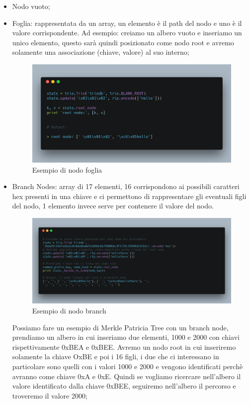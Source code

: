 \documentclass[12pt]{report}
\begin{document}
\begin{itemize}
\item Nodo vuoto;
\item Foglia: rappresentata da un array, un elemento è il path del nodo e uno è il valore corrispondente. Ad esempio: creiamo un albero vuoto e inseriamo un unico elemento, questo sarà quindi posizionato come nodo root e avremo solamente una associazione (chiave, valore) al suo interno;

\begin{figure}[H]
    \includegraphics[width=\textwidth]{carbon-11}
    \caption{Esempio di nodo foglia}
\end{figure}
\item Branch Nodes: array di 17 elementi, 16 corrispondono ai possibili caratteri hex presenti in una chiave e ci permettono di rappresentare gli eventuali figli del nodo, 1 elemento invece serve per contenere il valore del nodo.

\begin{figure}[H]
    \includegraphics[width=\textwidth]{carbon-13}
    \caption{Esempio di nodo branch}
\end{figure}

Possiamo fare un esempio di Merkle Patricia Tree con un branch node, prendiamo un albero in cui inseriamo due elementi, 1000 e 2000 con chiavi rispettivamente 0xBEA e 0xBEE. 
Avremo un nodo root in cui inseriremo solamente la chiave OxBE e poi i 16 figli, i due che ci interessano in particolare sono quelli con i valori 1000 e 2000 e vengono identificati perchè avranno come chiave 0xA e 0xE. 
Quindi se vogliamo ricercare nell'albero il valore identificato dalla chiave 0xBEE, seguiremo nell'albero il percorso e troveremo il valore 2000;


\end{itemize}
\end{document}
